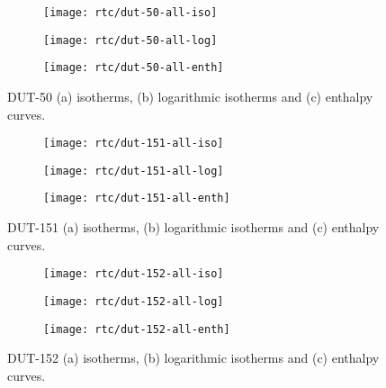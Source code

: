 \begin{figure}[H]
    \centering
    \begin{subfigure}{0.33\linewidth}
        \texttt{[image: rtc/dut-50-all-iso]}%
        \caption{}
    \end{subfigure}%
    \begin{subfigure}{0.33\linewidth}
        \texttt{[image: rtc/dut-50-all-log]}%
        \caption{}
    \end{subfigure}%
    \begin{subfigure}{0.33\linewidth}
        \texttt{[image: rtc/dut-50-all-enth]}%
        \caption{}
    \end{subfigure}%
    \caption{DUT-50 (a) isotherms, (b) logarithmic isotherms and 
    (c) enthalpy curves.}%
    \label{appx:dut:fgr:dut-50-butane-rtc}
\end{figure}

\begin{figure}[H]
    \centering
    \begin{subfigure}{0.33\linewidth}
        \texttt{[image: rtc/dut-151-all-iso]}%
        \caption{}
    \end{subfigure}%
    \begin{subfigure}{0.33\linewidth}
        \texttt{[image: rtc/dut-151-all-log]}%
        \caption{}
    \end{subfigure}%
    \begin{subfigure}{0.33\linewidth}
        \texttt{[image: rtc/dut-151-all-enth]}%
        \caption{}
    \end{subfigure}%
    \caption{DUT-151 (a) isotherms, (b) logarithmic isotherms and 
    (c) enthalpy curves.}%
    \label{appx:dut:fgr:dut-151-butane-rtc}
\end{figure}

\begin{figure}[H]
    \centering
    \begin{subfigure}{0.33\linewidth}
        \texttt{[image: rtc/dut-152-all-iso]}%
        \caption{}
    \end{subfigure}%
    \begin{subfigure}{0.33\linewidth}
        \texttt{[image: rtc/dut-152-all-log]}%
        \caption{}
    \end{subfigure}%
    \begin{subfigure}{0.33\linewidth}
        \texttt{[image: rtc/dut-152-all-enth]}%
        \caption{}
    \end{subfigure}%
    \caption{DUT-152 (a) isotherms, (b) logarithmic isotherms and 
    (c) enthalpy curves.}%
    \label{appx:dut:fgr:dut-152-butane-rtc}
\end{figure}

